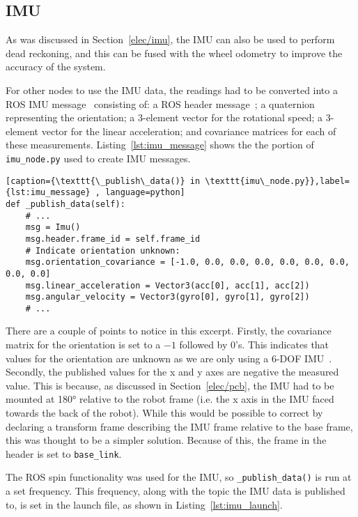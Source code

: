 \subsection{IMU}\label{soft/odometry/imu}

As was discussed in Section~\ref{elec/imu}, the IMU can also be used to
perform dead reckoning, and this can be fused with the wheel odometry to
improve the accuracy of the system.

For other nodes to use the IMU data, the readings had to be converted into
a ROS IMU message~\cite[sensor\_msgs/Imu.msg]{ROSDocs} consisting of: a ROS header message~\cite[std\_msgs/Header.msg]{ROSDocs};
a quaternion representing the orientation; a 3-element vector for
the rotational speed; a 3-element vector for the linear
acceleration; and covariance matrices for each of these measurements.
Listing~\ref{lst:imu_message} shows the the portion of \verb|imu_node.py| used to create IMU messages.


\begin{lstlisting}[caption={\texttt{\_publish\_data()} in \texttt{imu\_node.py}},label={lst:imu_message} , language=python]
def _publish_data(self):
    # ...
    msg = Imu()
    msg.header.frame_id = self.frame_id
    # Indicate orientation unknown:
    msg.orientation_covariance = [-1.0, 0.0, 0.0, 0.0, 0.0, 0.0, 0.0, 0.0, 0.0]
    msg.linear_acceleration = Vector3(acc[0], acc[1], acc[2])
    msg.angular_velocity = Vector3(gyro[0], gyro[1], gyro[2])
    # ...
\end{lstlisting}

There are a couple of points to notice in this excerpt. Firstly, the
covariance matrix for the orientation is set to a $-1$ followed by 0's.
This indicates that values for the orientation are unknown as we are only
using a 6-DOF IMU~\cite[sensor\_msgs/Imu.msg]{ROSDocs}. Secondly, the published values for the
x and y axes are negative the measured value. This is because, as
discussed in Section~\ref{elec/pcb}, the IMU had to be mounted at
\ang{180} relative to the robot frame (i.e. the x axis in the IMU faced
towards the back of the robot). While this would be possible to correct by
declaring a transform frame describing the IMU frame relative to the base
frame, this was thought to be a simpler solution. Because of this, the
frame in the header is set to \verb|base_link|.

The ROS spin functionality was used for the IMU, so
\verb|_publish_data()| is run at a set
frequency. This frequency, along with the topic the
IMU data is published to, is set in the launch file, as
shown in Listing~\ref{lst:imu_launch}.

